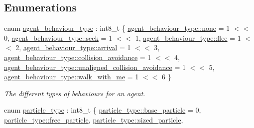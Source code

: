 \subsection*{Enumerations}
\begin{DoxyCompactItemize}
\item 
enum \hyperlink{namespacephysim_1_1particles_a033757595f7862a0fc8a389d79bf9c88}{agent\+\_\+behaviour\+\_\+type} \+: int8\+\_\+t \{ \newline
\hyperlink{namespacephysim_1_1particles_a033757595f7862a0fc8a389d79bf9c88a334c4a4c42fdb79d7ebc3e73b517e6f8}{agent\+\_\+behaviour\+\_\+type\+::none} = 1 $<$$<$ 0, 
\hyperlink{namespacephysim_1_1particles_a033757595f7862a0fc8a389d79bf9c88ae6f6362248805a36c61d205dbc6f4076}{agent\+\_\+behaviour\+\_\+type\+::seek} = 1 $<$$<$ 1, 
\hyperlink{namespacephysim_1_1particles_a033757595f7862a0fc8a389d79bf9c88a918634f9410d3be95b2c6074f18cc62b}{agent\+\_\+behaviour\+\_\+type\+::flee} = 1 $<$$<$ 2, 
\hyperlink{namespacephysim_1_1particles_a033757595f7862a0fc8a389d79bf9c88a0d4144ffc7e8e66a72800ea2b4101fd0}{agent\+\_\+behaviour\+\_\+type\+::arrival} = 1 $<$$<$ 3, 
\newline
\hyperlink{namespacephysim_1_1particles_a033757595f7862a0fc8a389d79bf9c88aa150bf2057adbf0518b8bd2a4019d5a4}{agent\+\_\+behaviour\+\_\+type\+::collision\+\_\+avoidance} = 1 $<$$<$ 4, 
\hyperlink{namespacephysim_1_1particles_a033757595f7862a0fc8a389d79bf9c88a6fdb0358d9b651e9e9eb5c255ab998e0}{agent\+\_\+behaviour\+\_\+type\+::unaligned\+\_\+collision\+\_\+avoidance} = 1 $<$$<$ 5, 
\hyperlink{namespacephysim_1_1particles_a033757595f7862a0fc8a389d79bf9c88af30345cdf3a84d8528df256adaa00e20}{agent\+\_\+behaviour\+\_\+type\+::walk\+\_\+with\+\_\+me} = 1 $<$$<$ 6
 \}\begin{DoxyCompactList}\small\item\em The different types of behaviours for an agent. \end{DoxyCompactList}
\item 
enum \hyperlink{namespacephysim_1_1particles_a068e6cda6626fbd381c07a9835425b08}{particle\+\_\+type} \+: int8\+\_\+t \{ \newline
\hyperlink{namespacephysim_1_1particles_a068e6cda6626fbd381c07a9835425b08ab475beb2641566c6d36adda0024a1ba1}{particle\+\_\+type\+::base\+\_\+particle} = 0, 
\hyperlink{namespacephysim_1_1particles_a068e6cda6626fbd381c07a9835425b08a6c30f0004aaf69e5cf185346e8f322d8}{particle\+\_\+type\+::free\+\_\+particle}, 
\hyperlink{namespacephysim_1_1particles_a068e6cda6626fbd381c07a9835425b08aba7a75b3240c0e68fe64be562e4f6f81}{particle\+\_\+type\+::sized\+\_\+particle}, 
$$
\end{DoxyCompactItemize}
